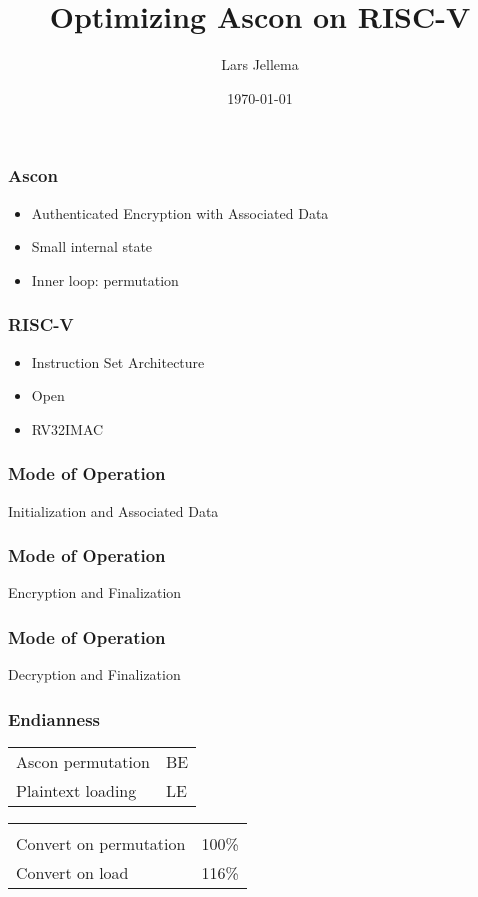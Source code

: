 \documentclass[17pt]{beamer}
\title{Optimizing Ascon on RISC-V}
\author{Lars Jellema}
\date{\today}
\begin{document}
\maketitle

\begin{frame}
    \frametitle{Ascon}
    \begin{itemize}
        \item Authenticated Encryption with Associated Data
        \item Small internal state
        \item Inner loop: permutation
    \end{itemize}
\end{frame}

\begin{frame}
    \frametitle{RISC-V}
    \begin{itemize}
        \item Instruction Set Architecture
        \item Open
        \item RV32IMAC
    \end{itemize}
\end{frame}

\begin{frame}
    \frametitle{Mode of Operation}
    Initialization and Associated Data
    \begin{center}
        
    \end{center}
\end{frame}

\begin{frame}
    \frametitle{Mode of Operation}
    Encryption and Finalization
    \begin{center}
        
    \end{center}
\end{frame}

\begin{frame}
    \frametitle{Mode of Operation}
    Decryption and Finalization
    \begin{center}
        
    \end{center}
\end{frame}

\begin{frame}
    \frametitle{Endianness}
    \begin{center}
    \begin{tabular}{l l}
        Ascon permutation & BE \\
        Plaintext loading & LE \\
    \end{tabular}
    \begin{tabular}{l l}
        \\\\
        Convert on permutation & 100\% \\
        Convert on load & 116\% \\
    \end{tabular}
    \end{center}
\end{frame}
\end{document}
